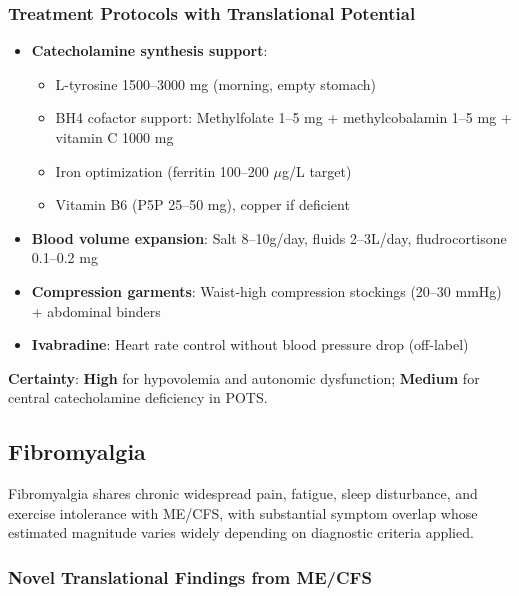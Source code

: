 \subsubsection{Treatment Protocols with Translational Potential}

\begin{itemize}
    \item \textbf{Catecholamine synthesis support}:
    \begin{itemize}
        \item L-tyrosine 1500--3000 mg (morning, empty stomach)
        \item BH4 cofactor support: Methylfolate 1--5 mg + methylcobalamin 1--5 mg + vitamin C 1000 mg
        \item Iron optimization (ferritin 100--200 $\mu$g/L target)
        \item Vitamin B6 (P5P 25--50 mg), copper if deficient
    \end{itemize}
    \item \textbf{Blood volume expansion}: Salt 8--10g/day, fluids 2--3L/day, fludrocortisone 0.1--0.2 mg
    \item \textbf{Compression garments}: Waist-high compression stockings (20--30 mmHg) + abdominal binders
    \item \textbf{Ivabradine}: Heart rate control without blood pressure drop (off-label)
\end{itemize}

\textbf{Certainty}: \textbf{High} for hypovolemia and autonomic dysfunction; \textbf{Medium} for central catecholamine deficiency in POTS.

\subsection{Fibromyalgia}
\label{sec:fibromyalgia}

Fibromyalgia shares chronic widespread pain, fatigue, sleep disturbance, and exercise intolerance with ME/CFS, with substantial symptom overlap whose estimated magnitude varies widely depending on diagnostic criteria applied.

\subsubsection{Novel Translational Findings from ME/CFS}

